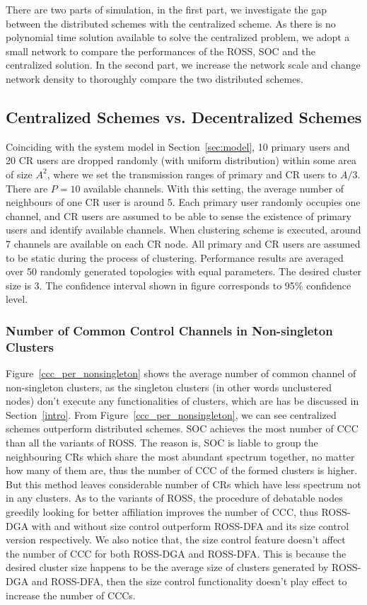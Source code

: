 There are two parts of simulation, in the first part, we investigate the gap between the distributed schemes with the centralized scheme.
As there is no polynomial time solution available to solve the centralized problem, we adopt a small network to compare the performances of the ROSS, SOC and the centralized solution.
In the second part, we increase the network scale and change network density to thoroughly compare the two distributed schemes.
\subsection{Centralized Schemes vs. Decentralized Schemes}
Coinciding with the system model in Section~\ref{sec:model}, 10 primary users and 20 CR users are dropped randomly (with uniform distribution) within some area of size $A^{2}$, where we set the transmission ranges of primary and CR users to $A/3$. There are $P=10$ available channels. 
With this setting, the average number of neighbours of one CR user is around 5.
Each primary user randomly occupies one channel, and CR users are assumed to be able to sense the existence of primary users and identify available channels.
When clustering scheme is executed, around 7 channels are available on each CR node.
All primary and CR users are assumed to be static during the process of clustering.
Performance results are averaged over 50 randomly generated topologies with equal parameters.
The desired cluster size is 3.
The confidence interval shown in figure corresponds to 95\% confidence level.

\subsubsection{Number of Common Control Channels in Non-singleton Clusters}
\label{ccc_20}
Figure~\ref{ccc_per_nonsingleton} shows the average number of common channel of non-singleton clusters, as the singleton clusters (in other words unclustered nodes) don't execute any functionalities of clusters, which are has be discussed in Section~\ref{intro}.
From Figure~\ref{ccc_per_nonsingleton}, we can see centralized schemes outperform distributed schemes.
SOC achieves the most number of CCC than all the variants of ROSS.
The reason is, SOC is liable to group the neighbouring CRs which share the most abundant spectrum together, no matter how many of them are, thus the number of CCC of the formed clusters is higher.
But this method leaves considerable number of CRs which have less spectrum not in any clusters.
As to the variants of ROSS, the procedure of debatable nodes greedily looking for better affiliation improves the number of CCC, thus ROSS-DGA with and without size control outperform ROSS-DFA and its size control version respectively.
We also notice that, the size control feature doesn't affect the number of CCC for both ROSS-DGA and ROSS-DFA.
This is because the desired cluster size happens to be the average size of clusters generated by ROSS-DGA and ROSS-DFA, then the size control functionality doesn't play effect to increase the number of CCCs.


